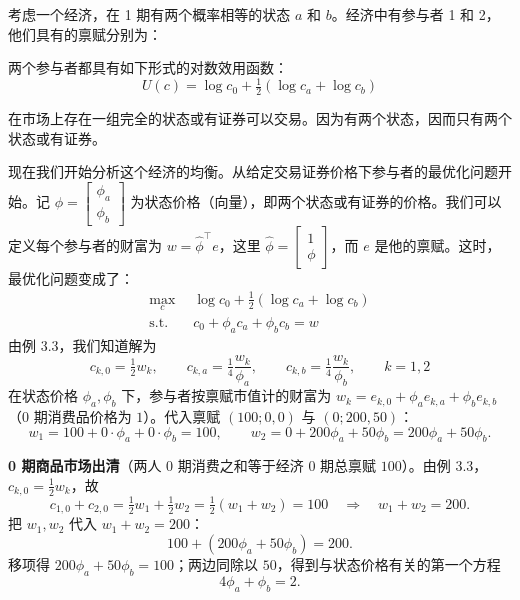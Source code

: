     \begin{problem}
         考虑一个经济，在 1 期有两个概率相等的状态 $a$ 和 $b$。经济中有参与者 1 和 2，他们具有的禀赋分别为：
        \begin{center}
        \qquad
        \end{center}
        两个参与者都具有如下形式的对数效用函数：
        \[
            U(c)=\log c_{0}+\tfrac12(\log c_{a}+\log c_{b})
        \]
        \end{problem}
        \begin{solution}
        在市场上存在一组完全的状态或有证券可以交易。因为有两个状态，因而只有两个状态或有证券。
        
        现在我们开始分析这个经济的均衡。从给定交易证券价格下参与者的最优化问题开始。记 $\phi=\begin{bmatrix}\phi_{a} \\ \phi_{b}\end{bmatrix}$ 为状态价格（向量），即两个状态或有证券的价格。我们可以定义每个参与者的财富为 $w=\hat{\phi}^{\top}e$，这里 $\hat{\phi}=\begin{bmatrix}1 \\ \phi\end{bmatrix}$，而 $e$ 是他的禀赋。这时，最优化问题变成了：
        \[
            \begin{aligned}
                \max_{c}\ &\log c_{0}+\tfrac12(\log c_{a}+\log c_{b})\\
                \mathrm{s.t.}\quad &c_{0}+\phi_{a}c_{a}+\phi_{b}c_{b}=w
            \end{aligned}
        \]
        由例 3.3，我们知道解为
        \[
            c_{k,0}=\tfrac12 w_{k},\qquad
            c_{k,a}=\tfrac14\frac{w_{k}}{\phi_{a}},\qquad
            c_{k,b}=\tfrac14\frac{w_{k}}{\phi_{b}},\qquad k=1,2
        \]
        在状态价格 $\phi_{a},\phi_{b}$ 下，参与者按禀赋市值计的财富为 $w_{k}=e_{k,0}+\phi_{a}e_{k,a}+\phi_{b}e_{k,b}$（0 期消费品价格为 $1$）。代入禀赋 $(100;0,0)$ 与 $(0;200,50)$：
        \[
            w_{1}=100+0\cdot\phi_{a}+0\cdot\phi_{b}=100,\qquad
            w_{2}=0+200\phi_{a}+50\phi_{b}=200\phi_{a}+50\phi_{b}.
        \]

        \textbf{0 期商品市场出清}（两人 0 期消费之和等于经济 0 期总禀赋 $100$）。由例 3.3，$c_{k,0}=\tfrac12 w_{k}$，故
        \[
            c_{1,0}+c_{2,0}=\tfrac12 w_{1}+\tfrac12 w_{2}=\tfrac12(w_{1}+w_{2})=100
            \quad\Longrightarrow\quad w_{1}+w_{2}=200.
        \]
        把 $w_{1},w_{2}$ 代入 $w_{1}+w_{2}=200$：
        \[
            100+(200\phi_{a}+50\phi_{b})=200.
        \]
        移项得 $200\phi_{a}+50\phi_{b}=100$；两边同除以 $50$，得到与状态价格有关的第一个方程
        \[
            4\phi_{a}+\phi_{b}=2.
        \]


\end{solution}

